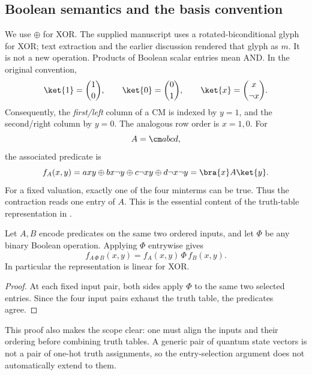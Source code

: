\subsection{Boolean semantics and the basis convention}
We use $\oplus$ for XOR. The supplied manuscript uses a rotated-biconditional glyph for XOR; text extraction and the earlier discussion rendered that glyph as $m$. It is not a new operation. Products of Boolean scalar entries mean AND. In the original convention,
\begin{equation}
 \ket{1}=\binom10,\qquad \ket{0}=\binom01,\qquad
 \ket{x}=\binom{x}{\neg x}.
\end{equation}
Consequently, the \emph{first/left} column of a CM is indexed by $y=1$, and the second/right column by $y=0$. The analogous row order is $x=1,0$. For
\begin{equation}
 A=\cm abcd,
\end{equation}
the associated predicate is
\begin{equation}\label{eq:predicate}
 f_A(x,y)=a xy\oplus b x\neg y\oplus c\neg x y\oplus d\neg x\neg y
          =\bra{x}A\ket{y}.
\end{equation}
For a fixed valuation, exactly one of the four minterms can be true. Thus the contraction reads one entry of $A$. This is the essential content of the truth-table representation in \cite[Sections 2.2--3]{droncheff}.

\begin{proposition}\label{prop:pointwise}
Let $A,B$ encode predicates on the same two ordered inputs, and let $\Phi$ be any binary Boolean operation. Applying $\Phi$ entrywise gives
\begin{equation}
 f_{A\,\Phi\,B}(x,y)=f_A(x,y)\,\Phi\,f_B(x,y).
\end{equation}
In particular the representation is linear for XOR.
\end{proposition}
\begin{proof}
At each fixed input pair, both sides apply $\Phi$ to the same two selected entries. Since the four input pairs exhaust the truth table, the predicates agree.
\end{proof}
This proof also makes the scope clear: one must align the inputs and their ordering before combining truth tables. A generic pair of quantum state vectors is not a pair of one-hot truth assignments, so the entry-selection argument does not automatically extend to them.

